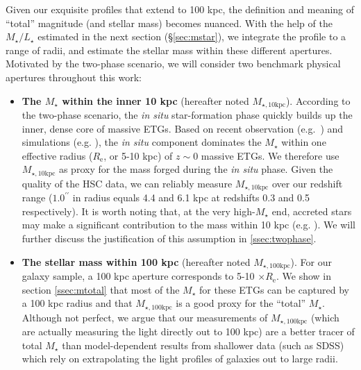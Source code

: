 \documentclass[a4paper,fleqn,usenatbib]{mnras}
\def\arcsec{{\prime\prime}}
\def\mstar{{$M_{\star}$}}
\def\minn{{$M_{\star,10\mathrm{kpc}}$}}
\def\mtot{{$M_{\star,100\mathrm{kpc}}$}}
\def\m2l{{$M_{\star}/L_{\star}$}}
\begin{document}
    Given our exquisite profiles that extend to 100 kpc, the definition and meaning 
    of ``total'' magnitude (and stellar mass) becomes nuanced.
    With the help of the \m2l{} estimated in the next section (\S \ref{sec:mstar}), 
    we integrate the profile to a range of radii, and estimate the stellar mass 
    within these different apertures.  
    Motivated by the two-phase scenario, we will consider two benchmark physical 
    apertures throughout this work:
    
    \begin{itemize} 
       
        \item \textbf{The \mstar{} within the inner 10 kpc} 
            (hereafter noted \minn{}). 
            According to the two-phase scenario, the \textit{in situ} star-formation phase quickly builds up the inner, dense core of massive ETGs.  
            Based on recent observation (e.g.~\citealt{vanDokkum2010}) and 
            simulations (e.g. \citealt{RodriguezGomez2016}), the \textit{in situ} 
            component dominates the \mstar{} within one effective radius 
            ($R_{\mathrm{e}}$, or 5-10 kpc) of $z{\sim}0$ massive ETGs.
            We therefore use \minn{} as proxy for the mass forged during the 
            \textit{in situ} phase. 
            Given the quality of the HSC data, we can reliably measure \minn{} over 
            our redshift range ($1.0^{\arcsec}$ in radius equals 4.4 and 6.1 kpc 
            at redshifts 0.3 and 0.5 respectively).  
            It is worth noting that, at the very high-\mstar{} end, accreted stars may make a significant contribution to the mass within 10 kpc 
            (e.g. \citealt{RodriguezGomez2016}). We will further discuss the justification of this assumption in 
            \ref{ssec:twophase}.
            
        \item \textbf{The stellar mass within 100 kpc} 
            (hereafter noted \mtot{}). 
            For our galaxy sample, a 100 kpc aperture corresponds to 5-10 
            $\times R_{\mathrm{e}}$. 
            We show in section \ref{ssec:mtotal} that most of the \mstar{} for 
            these ETGs can be captured by a 100 kpc radius and that \mtot{} is 
            a good proxy for the ``total'' \mstar{}. 
            Although not perfect, we argue that our measurements of \mtot{} (which are 
            actually measuring the light directly out to 100 kpc) are a better tracer 
            of total \mstar{} than model-dependent results from shallower data 
            (such as SDSS) which rely on extrapolating the light profiles of galaxies 
            out to large radii.
            
       \end{itemize}
       
\end{document}
